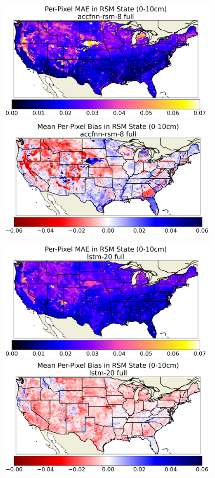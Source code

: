 \begin{figure}[hp!]
    \centering

    \includegraphics[width=.48\linewidth,draft=false]{figures/grid-eval_best_full/eval-grid_full_accfnn-rsm-8_rsm-10_spatial-stats_abs-err_state-err-abs-mean.png}
    \includegraphics[width=.48\linewidth,draft=false]{figures/grid-eval_best_full/eval-grid_full_accfnn-rsm-8_rsm-10_spatial-stats_bias_state-err-bias-mean.png}

    \includegraphics[width=.48\linewidth,draft=false]{figures/grid-eval_best_full/eval-grid_full_lstm-20_rsm-10_spatial-stats_abs-err_state-err-abs-mean.png}
    \includegraphics[width=.48\linewidth,draft=false]{figures/grid-eval_best_full/eval-grid_full_lstm-20_rsm-10_spatial-stats_bias_state-err-bias-mean.png}


\end{figure}
